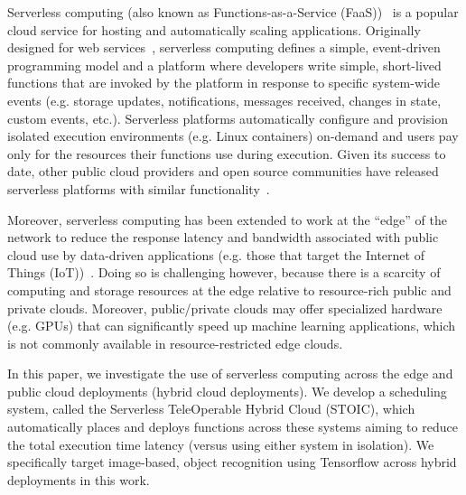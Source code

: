 Serverless computing (also known as Functions-as-a-Ser\-vice (FaaS))~\cite{ref:aws-lambda,ref:faas3,ref:afunctions-16} is a popular cloud service for hosting and automatically scaling applications. Originally designed for web services~\cite{ref:lambda-webservices,ref:lambda-microservices}, serverless computing defines a simple, event-driven programming model and a platform where developers write simple, short-lived functions that are invoked by the platform in response to specific system-wide events (e.g. storage updates, notifications, messages received, changes in state, custom events, etc.). Serverless platforms automatically configure and provision isolated execution environments (e.g. Linux containers) on-demand and users pay only for the resources their functions use during execution. Given its success to date, other public cloud providers and open source communities have released serverless platforms with similar functionality~\cite{ref:gfunctions-16,ref:openwhisk-16,ref:ironio-16}.

Moreover, serverless computing has been extended to work at the ``edge'' of the network to reduce the response latency and bandwidth associated with public cloud use by data-driven applications (e.g.  those that target the Internet of Things (IoT))~\cite{ aws-greengrass, iothub-web, iotedge-web}. Doing so is challenging however, because there is a scarcity of computing and storage resources at the edge relative to resource-rich public and private clouds. Moreover, public/private clouds may offer specialized hardware (e.g. GPUs) that can significantly speed up machine learning applications, which is not commonly available in resource-restricted edge clouds.

In this paper, we investigate the use of serverless computing across the edge and public cloud deployments (hybrid cloud deployments). We develop a scheduling system, called the Serverless TeleOperable Hybrid Cloud (STOIC), which automatically places and deploys functions across these systems aiming to reduce the total execution time latency (versus using either system in isolation). We specifically target image-based, object recognition using Tensorflow across hybrid deployments in this work.

